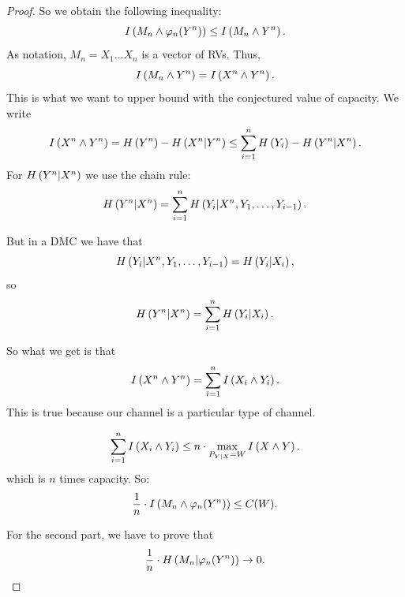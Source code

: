\begin{proof}
	So we obtain the following inequality:
	\begin{equation*}
		I \left( {M_n \land \varphi_n(Y^n)} \right) \le
		I \left( {M_n \land Y^n} \right).
	\end{equation*}
	As notation, $M_n = X_1 \dots X_n$ is a vector of \acp{RV}.
	Thus,
	\begin{equation*}
		I \left( {M_n \land Y^n} \right) =
		I \left( {X^n \land Y^n} \right).
	\end{equation*}
	This is what we want to upper bound with the conjectured value of capacity.
	We write
	\begin{equation*}
		I \left( {X^n \land Y^n} \right) =
		H\left({Y^n}\right) - H\left({X^n | Y^n}\right) \le
		\sum_{i = 1}^n H\left({Y_i}\right) - H\left({Y^n | X^n}\right).
	\end{equation*}
	For $H\left({Y^n | X^n}\right)$ we use the chain rule:
	\begin{equation*}
		H\left({Y^n | X^n}\right) =
		\sum_{i = 1}^n H\left({Y_i | X^n, Y_1, \dots, Y_{i-1}}\right).
	\end{equation*}

	But in a \ac{DMC} we have that
	\begin{equation*}
		H\left({Y_i | X^n, Y_1, \dots, Y_{i-1}}\right) =
		H\left({Y_i | X_i}\right),
	\end{equation*}
	so
	\begin{equation*}
		H\left({Y^n | X^n}\right) = \sum_{i = 1}^{n} H\left({Y_i | X_i}\right).
	\end{equation*}

	So what we get is that
	\begin{equation*}
		I \left( {X^n \land Y^n} \right) =
		\sum_{i = 1}^{n} I \left( {X_i \land Y_i} \right).
	\end{equation*}
	This is true because our channel is a particular type of channel.

	\begin{equation*}
		\sum_{i = 1}^{n} I \left( {X_i \land Y_i} \right) \le
		n \cdot \max_{P_{Y|X} = W} I \left( {X \land Y} \right).
	\end{equation*}
	which is $n$ times capacity.
	So:
	\begin{equation*}
		\frac{1}{n} \cdot I \left( {M_n \land \varphi_n(Y^n)} \right) \le C(W).
	\end{equation*}

	For the second part, we have to prove that 
	\begin{equation*}
		\frac{1}{n} \cdot H\left({M_n | \varphi_n(Y^n)}\right) \to 0.
	\end{equation*}


\end{proof}
